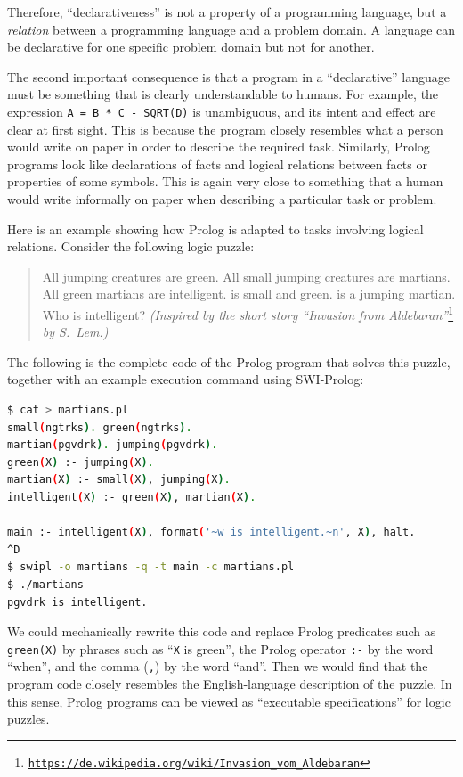 Therefore, \textsf{``}declarativeness\textsf{''} is not  a property of a programming
language, but a \emph{relation} between a programming language and
a problem domain. A language can be declarative for one specific problem
domain but not for another.

The second important consequence is that a program in a \textsf{``}declarative\textsf{''}
language must be something that is clearly understandable to humans.
For example, the expression \lstinline!A = B * C - SQRT(D)! is unambiguous,
and its intent and effect are clear at first sight. This is because
the program closely resembles what a person would write on paper in
order to describe the required task. Similarly, Prolog programs look
like declarations of facts and logical relations between facts or
properties of some symbols. This is again very close to something
that a human would write informally on paper when describing a particular
task or problem.

Here is an example showing how Prolog is adapted to tasks involving
logical relations. Consider the following logic puzzle:
\begin{quotation}
All jumping creatures are green. All small jumping creatures are martians.
All green martians are intelligent.  is small and green.
 is a jumping martian. Who is intelligent? \emph{(Inspired
by the short story \textsf{``}Invasion from Aldebaran\textsf{''}}\footnote{\texttt{\href{https://de.wikipedia.org/wiki/Invasion_vom_Aldebaran}{https://de.wikipedia.org/wiki/Invasion\_vom\_Aldebaran}}}\emph{
by S.~Lem.)}
\end{quotation}
The following is the complete code of the Prolog program that solves
this puzzle, together with an example execution command using SWI-Prolog:
\begin{lstlisting}[language=bash]
$ cat > martians.pl
small(ngtrks). green(ngtrks).
martian(pgvdrk). jumping(pgvdrk).
green(X) :- jumping(X).
martian(X) :- small(X), jumping(X).
intelligent(X) :- green(X), martian(X).

main :- intelligent(X), format('~w is intelligent.~n', X), halt.
^D
$ swipl -o martians -q -t main -c martians.pl
$ ./martians
pgvdrk is intelligent.
\end{lstlisting}
We could mechanically rewrite this code and replace Prolog predicates
such as \lstinline!green(X)! by phrases such as \textsf{``}\lstinline!X!
is green\textsf{''}, the Prolog operator \lstinline!:-! by the word \textsf{``}when\textsf{''},
and the comma (\lstinline!,!) by the word \textsf{``}and\textsf{''}. Then we would
find that the program code closely resembles the English-language
description of the puzzle. In this sense, Prolog programs can be viewed
as \textsf{``}executable specifications\textsf{''} for logic puzzles. 

